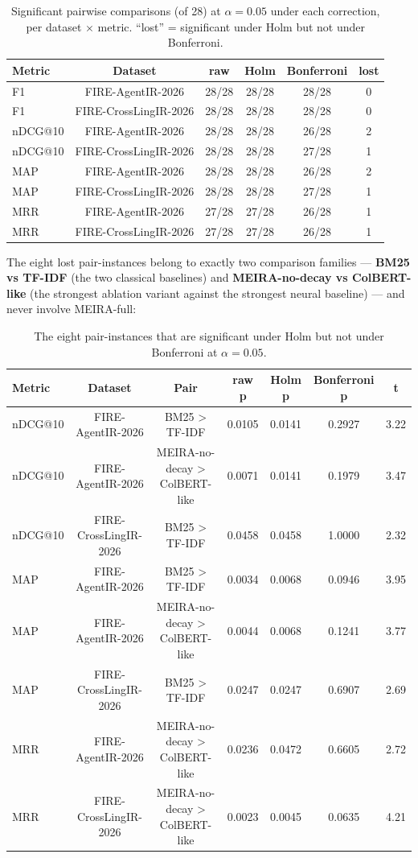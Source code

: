 \begin{table}[tb]
\setlength{\tabcolsep}{3pt}
\footnotesize
\caption{Significant pairwise comparisons (of 28) at $\alpha = 0.05$ under each correction, per dataset $\times$ metric. ``lost'' = significant under Holm but not under Bonferroni.}
\label{tab:corr-counts}
\centering
\begin{tabular}{lccccc}
\toprule
Metric & Dataset & raw & Holm & Bonferroni & lost \\
\midrule
F1 & FIRE-AgentIR-2026 & 28/28 & 28/28 & 28/28 & 0 \\
F1 & FIRE-CrossLingIR-2026 & 28/28 & 28/28 & 28/28 & 0 \\
nDCG@10 & FIRE-AgentIR-2026 & 28/28 & 28/28 & 26/28 & 2 \\
nDCG@10 & FIRE-CrossLingIR-2026 & 28/28 & 28/28 & 27/28 & 1 \\
MAP & FIRE-AgentIR-2026 & 28/28 & 28/28 & 26/28 & 2 \\
MAP & FIRE-CrossLingIR-2026 & 28/28 & 28/28 & 27/28 & 1 \\
MRR & FIRE-AgentIR-2026 & 27/28 & 27/28 & 26/28 & 1 \\
MRR & FIRE-CrossLingIR-2026 & 27/28 & 27/28 & 26/28 & 1 \\
\bottomrule
\end{tabular}
\end{table}

The eight lost pair-instances belong to exactly two comparison families --- \textbf{BM25 vs TF-IDF} (the two classical baselines) and \textbf{MEIRA-no-decay vs ColBERT-like} (the strongest ablation variant against the strongest neural baseline) --- and never involve MEIRA-full:

\begin{table}[tb]
\setlength{\tabcolsep}{3pt}
\footnotesize
\caption{The eight pair-instances that are significant under Holm but not under Bonferroni at $\alpha = 0.05$.}
\label{tab:lost-pairs}
\centering
\begin{tabular}{lcccccc}
\toprule
Metric & Dataset & Pair & raw p & Holm p & Bonferroni p & t \\
\midrule
nDCG@10 & FIRE-AgentIR-2026 & BM25 > TF-IDF & 0.0105 & 0.0141 & 0.2927 & 3.22 \\
nDCG@10 & FIRE-AgentIR-2026 & MEIRA-no-decay > ColBERT-like & 0.0071 & 0.0141 & 0.1979 & 3.47 \\
nDCG@10 & FIRE-CrossLingIR-2026 & BM25 > TF-IDF & 0.0458 & 0.0458 & 1.0000 & 2.32 \\
MAP & FIRE-AgentIR-2026 & BM25 > TF-IDF & 0.0034 & 0.0068 & 0.0946 & 3.95 \\
MAP & FIRE-AgentIR-2026 & MEIRA-no-decay > ColBERT-like & 0.0044 & 0.0068 & 0.1241 & 3.77 \\
MAP & FIRE-CrossLingIR-2026 & BM25 > TF-IDF & 0.0247 & 0.0247 & 0.6907 & 2.69 \\
MRR & FIRE-AgentIR-2026 & MEIRA-no-decay > ColBERT-like & 0.0236 & 0.0472 & 0.6605 & 2.72 \\
MRR & FIRE-CrossLingIR-2026 & MEIRA-no-decay > ColBERT-like & 0.0023 & 0.0045 & 0.0635 & 4.21 \\
\bottomrule
\end{tabular}
\end{table}

